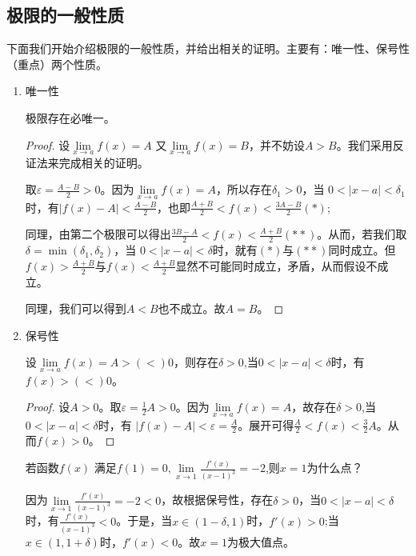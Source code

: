 \documentclass[cn,12pt,chinese]{elegantbook}
\begin{document}
\subsection{极限的一般性质}
下面我们开始介绍极限的一般性质，并给出相关的证明。主要有：唯一性、保号性（重点）两个性质。
\begin{enumerate}
    \item 唯一性
    \begin{property}
        极限存在必唯一。
    \end{property}
    
    \begin{proof}
    设$\lim\limits_{x \to a}f(x)=A $
    又$ \lim\limits_{x \to a}f(x)=B $，并不妨设$A>B$。我们采用反证法来完成相关的证明。
    
    取$ \varepsilon=\displaystyle\frac{A-B}{2}>0 $。因为$\lim\limits_{x \to a}f(x)=A $，所以存在$\delta_1>0 $，当 $0<\vert x-a\vert <\delta_1 $时，有$\vert{f(x)-A}\vert<\displaystyle\frac{A-B}{2}$，也即$\displaystyle\frac{A+B}{2}<f(x)<\frac{3A-B}{2}(*)$; 
    
    
    同理，由第二个极限可以得出$\displaystyle\frac{3B-A}{2}<f(x)<\displaystyle\frac{A+B}{2}(**)$。从而，若我们取$\delta=\min{(\delta_1,\delta_2)}$，当
    $ 0<\vert x-a\vert <\delta $时，就有$(*)$与$(**)$同时成立。但$f(x)>\displaystyle\frac{A+B}{2}$与$f(x)<\displaystyle\frac{A+B}{2}$显然不可能同时成立，矛盾，从而假设不成立。
    
    同理，我们可以得到$A<B$也不成立。故$A=B$。
    \end{proof}
    
    \item \FiveStar 保号性
    \begin{property}
        设$\lim\limits_{x \to a}f(x)=A>(<)0$，则存在$ \delta>0 $,当$ 0<\vert x-a\vert <\delta $时，有$f(x)>(<)0$。
    \end{property}
    \begin{proof}
        设$A>0$。取$\varepsilon=\displaystyle\frac{1}{2}A>0$。因为$\lim\limits_{x \to a}f(x)=A$，故存在$ \delta>0 $,当$ 0<\vert x-a\vert <\delta $时，有 $\vert{f(x)-A}\vert<\varepsilon=\displaystyle\frac{A}{2}$。展开可得$\displaystyle\frac{A}{2}<f(x)<\displaystyle\frac{3}{2}A$。从而$f(x)>0$。
    \end{proof}
    \begin{example}
       若函数$ f(x) $ 满足$ f(1)=0, \lim\limits_{x \to 1} \displaystyle\frac{f'(x)}{(x-1)^3}=-2 $,则$ x=1 $为什么点？
    \end{example}
    \begin{solution}
        因为$\lim\limits_{x \to 1}\displaystyle\frac{f'(x)}{(x-1)^3}=-2<0$，故根据保号性，存在$ \delta>0 $，当$ 0<\vert x-a\vert <\delta $时，有$\displaystyle\frac{f'(x)}{(x-1)^3}<0$。于是，当$x \in (1-\delta,1)$时，$f'(x)>0$;当$x \in (1,1+\delta)$时，$f'(x)<0$。故$x=1$为极大值点。
    \end{solution}
\end{enumerate}
\end{document}
